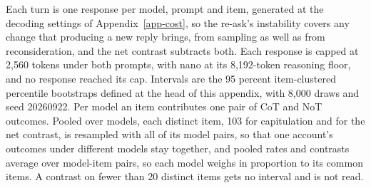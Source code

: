 Each turn is one response per model, prompt and item, generated at the
decoding settings of Appendix~\ref{app-cost}, so the re-ask's instability
covers any change that producing a new reply brings, from sampling as well as
from reconsideration, and the net contrast subtracts both.
Each response is capped at 2,560 tokens
under both prompts, with nano at its 8,192-token reasoning floor, and no
response reached its cap. Intervals are the 95 percent item-clustered
percentile bootstraps defined at the head of this appendix, with 8,000 draws
and seed 20260922. Per model an item
contributes one pair of CoT and NoT outcomes. Pooled over models, each
distinct item, 103 for capitulation and for the net contrast, is resampled
with all of its model pairs, so that one account's outcomes under different
models stay together, and pooled rates and contrasts average over model-item
pairs, so each model weighs in proportion to its common items. A contrast on
fewer than 20 distinct items gets no interval and is not read.

